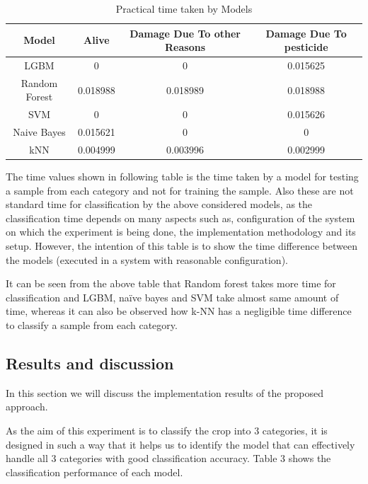 \documentclass[12pt]{article}
\begin{document}
\begin{table}[ht]
\centering

\caption{Practical time taken by Models}
\begin{tabular}{|c|c|c|c|}
\hline 
Model & Alive & Damage Due To other Reasons  & Damage Due To pesticide  \\ 
\hline 
LGBM & 0 & 0 & 0.015625 \\ 
\hline 
Random Forest & 0.018988 & 0.018989 & 0.018988 \\ 
\hline 
SVM & 0 & 0 & 0.015626 \\ 
\hline 
Naive Bayes & 0.015621 & 0 & 0 \\ 
\hline 
kNN & 0.004999 & 0.003996 & 0.002999 \\ 
\hline 
\end{tabular} 
\label{tab:caption}
\end{table}

The time values shown in following table is the time taken by a model for testing a sample from each category and not for training the sample. Also these are not standard time for classification by the above considered models, as the classification time depends on many aspects such as, configuration of the system on which the experiment is being done, the implementation methodology and its setup. However, the intention of this table is to show the time difference between the models (executed in a system with reasonable configuration).

 It can be seen from the above table that Random forest takes more time for classification and LGBM, naïve bayes and SVM take almost same amount of time, whereas it can also be observed how k-NN has a negligible time difference to classify a sample from each category.



\subsection{Results and discussion}
	In this section we will discuss the implementation results of the proposed approach.  
	
	As the aim of this experiment is to classify the crop into 3 categories, it is designed in such a way that it helps us to identify the model that can effectively handle all 3 categories with good classification accuracy.  Table 3 shows the classification performance of each model.
	
\end{document}
